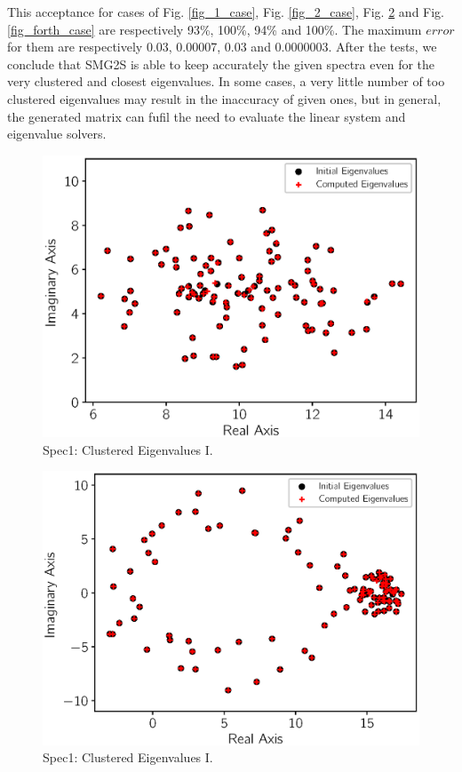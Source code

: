 This acceptance for cases of Fig. \ref{fig_1_case}, Fig. \ref{fig_2_case}, Fig. \ref{fig_second_case} and Fig. \ref{fig_forth_case} are respectively 93\%, 100\%, 94\% and 100\%. The maximum $error$ for them are respectively \num[round-precision=2,round-mode=figures]{0.03}, \num[round-precision=2,round-mode=figures]{0.00007}, \num[round-precision=2,round-mode=figures]{0.03} and \num[round-precision=2,round-mode=figures]{0.0000003}.  After the tests, we conclude that SMG2S is able to keep accurately the given spectra even for the very clustered and closest eigenvalues. In some cases, a very little number of too clustered eigenvalues may result in the inaccuracy of given ones, but in general, the generated matrix can fufil the need to evaluate the linear system and eigenvalue solvers. 

\begin{figure}[htbp]
	\centering
	\includegraphics[width=5.8in]{fig/matgen/vector1.eps}
	\caption{Spec1: Clustered Eigenvalues I.}
	\label{fig_first_case}
\end{figure}

\begin{figure}[htbp]
	\centering
	\includegraphics[width=5.8in]{fig/matgen/vector2.eps}
	\caption{Spec1: Clustered Eigenvalues I.}
	\label{fig_second_case}
\end{figure}

